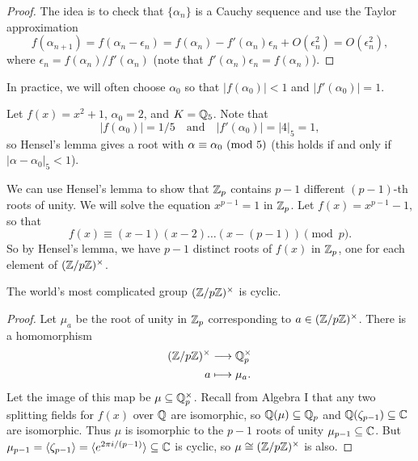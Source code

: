 \begin{proof}
  The idea is to check that $\{\alpha_n\}$ is a
  Cauchy sequence and use the
  Taylor approximation
  \[
    f(\alpha_{n + 1}) = f(\alpha_n - \epsilon_n)
    = f(\alpha_n) - f'(\alpha_n) \epsilon_n + O(\epsilon_n^2)
    = O(\epsilon_n^2)
  ,\]
  where $\epsilon_n = f(\alpha_n) / f'(\alpha_n)$
  (note that $f'(\alpha_n) \epsilon_n = f(\alpha_n)$).
\end{proof}

\begin{remark}
  In practice, we will often choose $\alpha_0$ so that
  $|f(\alpha_0)| < 1$ and $|f'(\alpha_0)| = 1$.
\end{remark}

\begin{example}
  Let $f(x) = x^2 + 1$, $\alpha_0 = 2$, and
  $K = \mathbb{Q}_5$. Note that
  \[
    |f(\alpha_0)| = 1 / 5
    \quad \text{and} \quad
    |f'(\alpha_0)| = |4|_5 = 1,
  \]
  so Hensel's lemma gives a root with
  $\alpha \equiv \alpha_0 \ (\mathrm{mod}\ 5)$ (this holds if and
  only if $|\alpha - \alpha_0|_5 < 1$).
\end{example}

\begin{example}
  We can use Hensel's lemma to show that
  $\mathbb{Z}_p$ contains $p - 1$ different $(p - 1)$-th
  roots of unity. We will solve the equation
  $x^{p - 1} = 1$ in $\mathbb{Z}_p$. Let $f(x) = x^{p - 1} - 1$,
  so that
  \[
    f(x) \equiv (x - 1)(x - 2) \dots (x - (p - 1)) \pmod{p}.
  \]
  So by Hensel's lemma, we have $p - 1$ distinct
  roots of $f(x)$ in $\mathbb{Z}_p$, one for each
  element of $(\mathbb{Z} / p\mathbb{Z})^\times$.
\end{example}

\begin{theorem}[Baker]
  The world's most complicated group
  $(\mathbb{Z} / p\mathbb{Z})^\times$ is cyclic.
\end{theorem}

\begin{proof}
  Let $\mu_a$ be the root of unity in $\mathbb{Z}_p$
  corresponding to $a \in (\mathbb{Z} / p\mathbb{Z})^\times$.
  There is a homomorphism
  \begin{align*}
    (\mathbb{Z} / p\mathbb{Z})^\times
    &\longrightarrow \mathbb{Q}_p^\times \\
    a &\longmapsto \mu_a.
  \end{align*}
  Let the image of this map be
  $\mu \subseteq \mathbb{Q}_p^\times$. Recall from
  Algebra I that any two splitting fields for
  $f(x)$ over $\mathbb{Q}$ are isomorphic, so
  $\mathbb{Q}(\mu) \subseteq \mathbb{Q}_p$ and
  $\mathbb{Q}(\zeta_{p - 1}) \subseteq \mathbb{C}$ are isomorphic.
  Thus $\mu$ is isomorphic to the $p - 1$ roots of
  unity $\mu_{p - 1} \subseteq \mathbb{C}$.
  But $\mu_{p - 1} = \langle \zeta_{p - 1} \rangle = \langle e^{2\pi i / (p - 1)} \rangle \subseteq \mathbb{C}$
  is cyclic, so $\mu \cong (\mathbb{Z} / p\mathbb{Z})^{\times}$ is also.
\end{proof}
